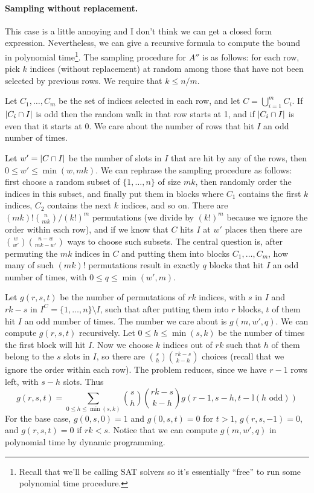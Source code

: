 \documentclass[11pt]{article}
\begin{document}
\paragraph{Sampling without replacement.}
This case is a little annoying and I don't think we can get a closed form
expression.
Nevertheless, we can give a recursive formula to compute the bound in polynomial
time\footnote{Recall that we'll be calling SAT solvers so it's essentially
  ``free'' to run some polynomial time procedure.}.
The sampling procedure for $A''$ is as follows: for each row, pick $k$ indices
(without replacement) at random among those that have not been selected by
previous rows.
We require that $k \leq n / m$.

Let $C_1, \dots, C_m$ be the set of indices selected in each row, and let $C =
\bigcup_{i=1}^m C_i$.
If $\left\lvert C_i \cap I\right\rvert$ is odd then the random walk in that row starts at 1, and if
$\left\lvert C_i \cap I\right\rvert$ is even that it starts at 0.
We care about the number of rows that hit $I$ an odd number of times.

Let $w' = \left\lvert C \cap I\right\rvert$ be the number of slots in $I$ that are hit by any of the
rows, then $0 \leq w' \leq \min(w, mk)$.
We can rephrase the sampling procedure as follows: first choose a random subset
of $\{ 1, \dots, n \}$ of size $mk$, then randomly order the indices in this
subset, and finally put them in blocks where $C_1$ contains the first $k$
indices, $C_2$ contains the next $k$ indices, and so on.
There are $(mk)! 
\binom{n}{mk} / (k!)^m$ permutations (we divide by $(k!)^m$ because we ignore
the order within each row), and if we know that $C$ hits $I$ at $w'$ places then
there are $\binom{w}{w'} \binom{n - w}{mk - w'}$ ways to choose such subsets.
The central question is, after permuting the $mk$ indices in $C$ and putting
them into blocks $C_1, \dots, C_m$, how many of such $(mk)!$ permutations result
in exactly $q$ blocks that hit $I$ an odd number of times, with $0 \leq q \leq
\min(w', m)$.

Let $g(r, s, t)$ be the number of permutations of $rk$ indices, with $s$ in $I$
and $rk - s$ in $I^C = \{ 1, \dots, n \} \setminus I$, such that after putting them into
$r$ blocks, $t$ of them hit $I$ an odd number of times.
The number we care about is $g(m, w', q)$.
We can compute $g(r, s, t)$ recursively.
Let $0 \leq h \leq \min(s, k)$ be the number of times the first block will hit $I$.
Now we choose $k$ indices out of $rk$ such that $h$ of them belong to the $s$
slots in $I$, so there are $\binom{s}{h} \binom{rk - s}{k - h}$ choices (recall
that we ignore the order within each row).
The problem reduces, since we have $r - 1$ rows left, with $s - h$ slots.
Thus
\begin{equation*}
  g(r, s, t) = \sum_{0 \leq h \leq \min(s, k)} \binom{s}{h}
  \binom{rk-s}{k - h} g(r-1, s-h,
  t-\mathbb{I}(h \text{ odd})) 
\end{equation*}
For the base case, $g(0, s, 0) = 1$ and $g(0, s, t) = 0$ for $t > 1$, $g(r, s,
-1) = 0$, and $g(r, s, t) = 0$ if $rk < s$.
Notice that we can compute $g(m, w', q)$ in polynomial time by dynamic
programming.
\end{document}

